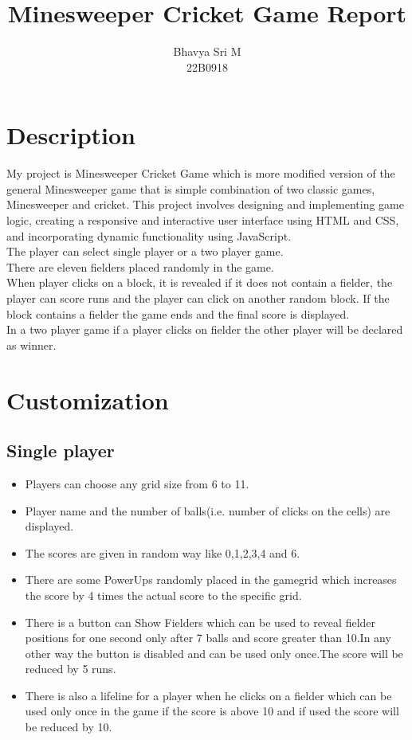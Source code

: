 \documentclass[12pt]{article}
\title{\textbf{Minesweeper Cricket \linebreak Game \linebreak Report}}
\author{Bhavya Sri M \\22B0918}
\date{}
\begin{document}
\maketitle

\tableofcontents
\clearpage

\section{Description}
My project is Minesweeper Cricket Game which is more modified version of the general Minesweeper game that is simple combination of two classic games, Minesweeper and cricket. This project involves designing and implementing game logic, creating a responsive and interactive user interface using HTML and CSS, and incorporating dynamic functionality using JavaScript.\\The player can select single player or a two player game.\\There are eleven fielders placed randomly in the game.\\When player clicks on a block, it is revealed if it does not contain a fielder, the player can score runs and the player can click on another random block. If the block contains a fielder the game ends and the final score is displayed.
\\In a two player game if a player clicks on fielder the other player will be declared as winner.

\section{Customization}
\subsection{Single player}
\begin{itemize}
    \item Players can choose any grid size from 6 to 11.
    \item Player name and the number of balls(i.e. number of clicks on the cells) are displayed.
    \item The scores are given in random way like 0,1,2,3,4 and 6.
    \item There are some PowerUps randomly placed in the gamegrid which increases the score by 4 times the actual score to the specific grid.
    \item There is a button can Show Fielders which can be used to reveal fielder positions for one second only after 7 balls and score greater than 10.In any other way the button is disabled and can be used only once.The score will be reduced by 5 runs.
    \item There is also a lifeline for a player when he clicks on a fielder which can be used only once in the game if the score is above 10 and if used the score will be reduced by 10.
\end{itemize}
\end{document}
